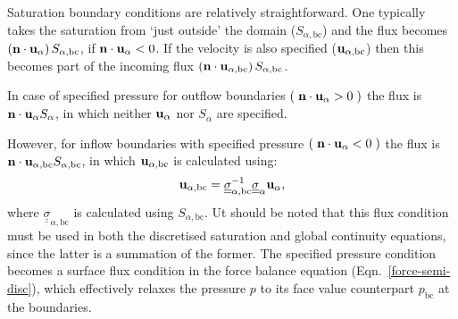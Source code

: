 Saturation boundary conditions are relatively straightforward. One typically takes the saturation from `just outside' the domain ($S_{\alpha, \text{bc}}$) and the flux becomes $\left({\bf n}\cdot {\bf u}_{\alpha}\right)S_{\alpha,\text{bc}}$, if ${\bf n}\cdot {\bf u}_{\alpha} < 0$. If the velocity is also specified (${\bf u}_{\alpha,\text{bc}}$) then this becomes part of the incoming flux $\left({\bf n}\cdot {\bf u}_{\alpha,\text{bc}}\right)S_{\alpha,\text{bc}}$.

In case of specified pressure for outflow boundaries $\left(\right.{\bf n}\cdot {\bf u}_\alpha>0\left.\right)$ the flux is ${\bf n}\cdot {\bf u}_\alpha {S_\alpha}$, in which neither ${\bf u}_\alpha$ nor ${S_\alpha}$ are specified. 

However, for inflow boundaries with specified pressure $\left(\right.{\bf n}\cdot {\bf u}_\alpha<0\left.\right)$ the flux is ${\bf n}\cdot {\bf u}_{\alpha,\text{bc}} S_{\alpha,\text{bc}}$, in which ${\bf u}_{\alpha,\text{bc}}$ is calculated using:
\begin{equation}
  {\bf u}_{\alpha,\text{bc}} =  \underline{\underline{\sigma}}_{\alpha,\text{bc}} ^{-1}  \underline{\underline{\sigma}}_{\alpha} {\bf u}_{\alpha},
\end{equation}
where $\underline{\underline{\sigma}}_{\alpha,\text{bc}}$ is calculated using $S_{\alpha,\text{bc}}$. Ut should be noted that this flux condition must be used in both the discretised saturation and global continuity equations, since the latter is a summation of the former. The specified pressure condition becomes a surface flux condition in the force balance equation (Eqn.~\ref{force-semi-disc}), which effectively relaxes the pressure $p$ to its face value counterpart $p_\text{bc}$ at the boundaries.


